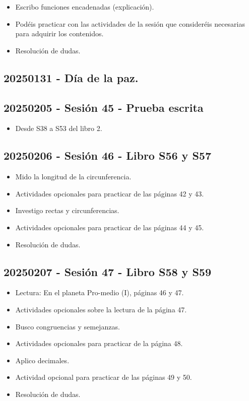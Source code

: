 \documentclass[a4paper,12pt]{article}
\begin{document}
\begin{itemize}
    \item Escribo funciones encadenadas (explicación).
    \item Podéis practicar con las actividades de la sesión que consideréis necesarias para adquirir los contenidos.
    \item Resolución de dudas.
\end{itemize}

\subsection{20250131 - Día de la paz.}

\subsection{20250205 - Sesión 45 - Prueba escrita}

\begin{itemize}
    \item Desde S38 a S53 del libro 2.
\end{itemize}

\subsection{20250206 - Sesión 46 - Libro S56 y S57}

\begin{itemize}
    \item Mido la longitud de la circunferencia.
    \item Actividades opcionales para practicar de las páginas 42 y 43.
    \item Investigo rectas y circunferencias.
    \item Actividades opcionales para practicar de las páginas 44 y 45.
    \item Resolución de dudas.
\end{itemize}

\subsection{20250207 - Sesión 47 - Libro S58 y S59}

\begin{itemize}
    \item Lectura: En el planeta Pro-medio (I), páginas 46 y 47.
    \item Actividades opcionales sobre la lectura de la página 47.
    \item Busco congruencias y semejanzas.
    \item Actividades opcionales para practicar de la página 48.
    \item Aplico decimales.
    \item Actividad opcional para practicar de las páginas 49 y 50.
    \item Resolución de dudas.
\end{itemize}
\end{document}
